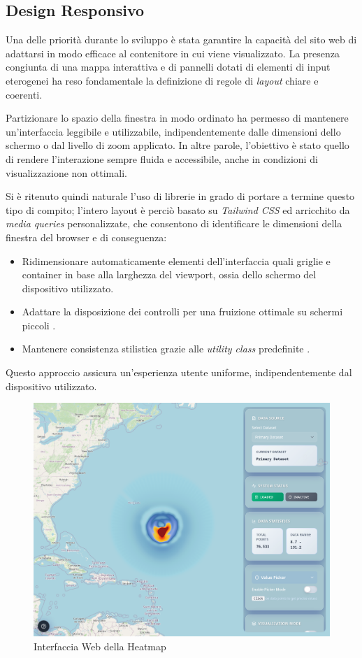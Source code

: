 \subsection{Design Responsivo}

Una delle priorità durante lo sviluppo è stata garantire la capacità del sito web di adattarsi in modo efficace al contenitore in cui viene visualizzato. La presenza congiunta di una mappa interattiva e di pannelli dotati di elementi di input eterogenei ha reso fondamentale la definizione di regole di \textit{layout} chiare e coerenti. 

Partizionare lo spazio della finestra in modo ordinato ha permesso di mantenere un'interfaccia leggibile e utilizzabile, indipendentemente dalle dimensioni dello schermo o dal livello di zoom applicato. In altre parole, l'obiettivo è stato quello di rendere l'interazione sempre fluida e accessibile, anche in condizioni di visualizzazione non ottimali.

Si è ritenuto quindi naturale l'uso di librerie in grado di portare a termine questo tipo di compito; l'intero layout è perciò basato su \textit{Tailwind CSS} ed arricchito da \textit{media queries} personalizzate, che consentono di identificare le dimensioni della finestra del browser e di conseguenza:
\begin{itemize}
  \item Ridimensionare automaticamente elementi dell'interfaccia quali griglie e container in base alla larghezza del viewport, ossia dello schermo del dispositivo utilizzato.
  \item Adattare la disposizione dei controlli per una fruizione ottimale su schermi piccoli \cite{tailwind-responsive}.
  \item Mantenere consistenza stilistica grazie alle \textit{utility class} predefinite \cite{tailwind-docs}.
\end{itemize}

Questo approccio assicura un'esperienza utente uniforme, indipendentemente dal dispositivo utilizzato.

\begin{figure}
    \centering
    \includegraphics[width=0.86\linewidth]{images/whole-map-homepage.png}
    \caption{Interfaccia Web della Heatmap}
    \label{fig:heatmap-homepage}
\end{figure}

